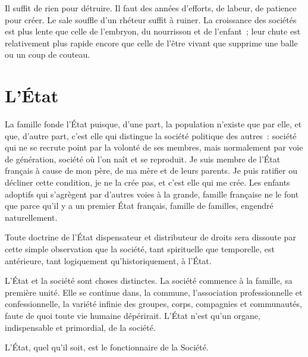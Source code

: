 \documentclass[french,twoside]{book} %
\newcommand{\astermono}{\medskip\centerline{\color{rubric}\large\selectfont{\syms ✻}}\medskip\par}%
\begin{document}
\astermono

\noindent Il suffit de rien pour détruire. Il faut des années d’efforts, de labeur, de patience pour créer. Le sale souffle d’un rhéteur suffit à ruiner. La croissance des sociétés est plus lente que celle de l’embryon, du nourrisson et de l’enfant ; leur chute est relativement plus rapide encore que celle de l’être vivant que supprime une balle ou un coup de couteau.
\section[L’État]{L’État}
\noindent La famille fonde l’État puisque, d’une part, la population n’existe que par elle, et que, d’autre part, c’est elle qui distingue la société politique des autres : société qui ne se recrute point par la volonté de ses membres, mais normalement par voie de génération, société où l’on naît et se reproduit. Je suis membre de l’État français à cause de mon père, de ma mère et de leurs parents. Je puis ratifier ou décliner cette condition, je ne la crée pas, et c’est elle qui me crée. Les enfants adoptifs qui s’agrègent par d’autres voies à la grande, famille française ne le font que parce qu’il y a un premier État français, famille de familles, engendré naturellement.\par

\astermono

\noindent Toute doctrine de l’État dispensateur et distributeur de droits sera dissoute par cette simple observation que la société, tant spirituelle que temporelle, est antérieure, tant logiquement qu’historiquement, à l’État.\par

\astermono

\noindent L’État et la société sont choses distinctes. La société commence à la famille, sa première unité. Elle se continue dans, la commune, l’association professionnelle et confessionnelle, la variété infinie des groupes, corps, compagnies et communautés, faute de quoi toute vie humaine dépérirait. L’État n’est qu’un organe, indispensable et primordial, de la société.\par

\astermono

\noindent L’État, quel qu’il soit, est le fonctionnaire de la Société.\par

\astermono
\end{document}

